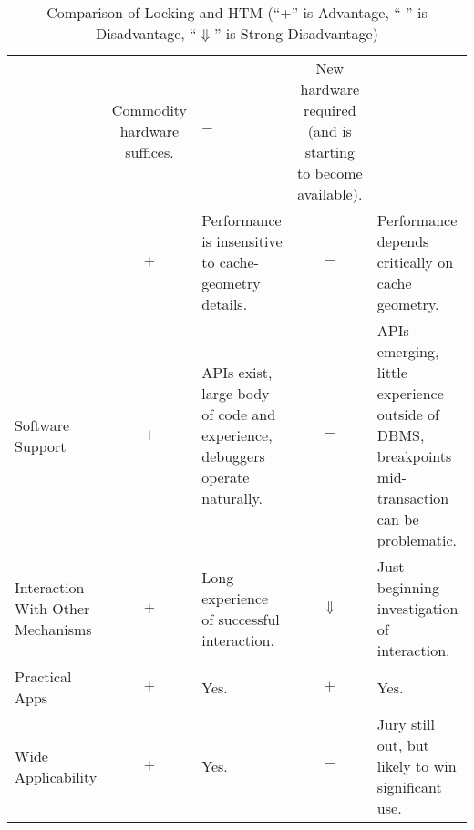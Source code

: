 \begin{table*}[p]
\begin{center}
\begin{tabular}{p{1.0in}||c|p{2.0in}||c|p{2.0in}}
	& Commodity hardware suffices.
		& $-$
		& New hardware required (and is starting to become
		  available). \\
\cline{2-5}
	& $+$
	& Performance is insensitive to cache-geometry details.
		& $-$
		& Performance depends critically on cache geometry. \\
\hline
Software Support
	& $+$
	& APIs exist, large body of code and experience, debuggers operate
	  naturally.
		& $-$
		& APIs emerging, little experience outside of DBMS,
		  breakpoints mid-transaction can be problematic. \\
\hline
Interaction With Other Mechanisms
	& $+$
	& Long experience of successful interaction.
		& $\Downarrow$
		& Just beginning investigation of interaction. \\
\hline
Practical Apps
	& $+$
	& Yes.
		& $+$
		& Yes. \\
\hline
Wide Applicability
	& $+$
	& Yes.
		& $-$
		& Jury still out, but likely to win significant use. \\
\end{tabular}
\end{center}
\caption{Comparison of Locking and HTM (``+'' is Advantage, ``-'' is Disadvantage, ``$\Downarrow$'' is Strong Disadvantage)}
\label{tab:future:Comparison of Locking and HTM}
\end{table*}
